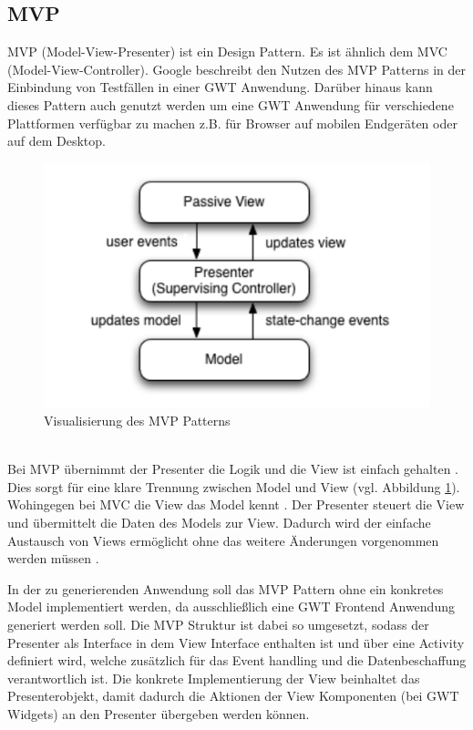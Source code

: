 \subsection{MVP}
\label{MVP}
MVP (Model-View-Presenter) ist ein Design Pattern. Es ist ähnlich dem MVC
(Model-View-Controller). Google beschreibt den Nutzen des MVP Patterns in der
Einbindung von Testfällen in einer GWT Anwendung. Darüber hinaus kann dieses
Pattern auch genutzt werden um eine GWT Anwendung für verschiedene Plattformen
verfügbar zu machen z.B. für Browser auf mobilen Endgeräten oder auf dem
Desktop.
\begin{figure}[htbp]
\begin{center}
\includegraphics{./img/MVP.pdf}
\caption{Visualisierung des MVP Patterns \cite{bib:MVP1}}\label{Fig:MVP}
\end{center}
\end{figure}\\
Bei MVP übernimmt der Presenter die Logik und die View ist einfach gehalten
\cite{bib:MVP2}. Dies sorgt für eine klare Trennung zwischen Model und View (vgl.
Abbildung \ref{Fig:MVP}). Wohingegen bei MVC die View das Model kennt
\cite{bib:MVCvsMVP}. Der Presenter steuert die View und übermittelt die Daten
des Models zur View.
Dadurch wird der einfache Austausch von Views ermöglicht ohne das weitere
Änderungen vorgenommen werden müssen \cite{bib:MVP1}\cite{bib:MVP2}.

In der zu generierenden Anwendung soll das MVP Pattern ohne ein konkretes Model
implementiert werden, da ausschließlich eine GWT Frontend Anwendung generiert
werden soll. Die MVP Struktur ist dabei so umgesetzt, sodass der Presenter als
Interface in dem View Interface enthalten ist und über eine Activity definiert
wird, welche zusätzlich für das Event handling und die Datenbeschaffung verantwortlich
ist. Die konkrete Implementierung der View beinhaltet das Presenterobjekt, damit
dadurch die Aktionen der View Komponenten (bei GWT Widgets) an den Presenter
übergeben werden können.
